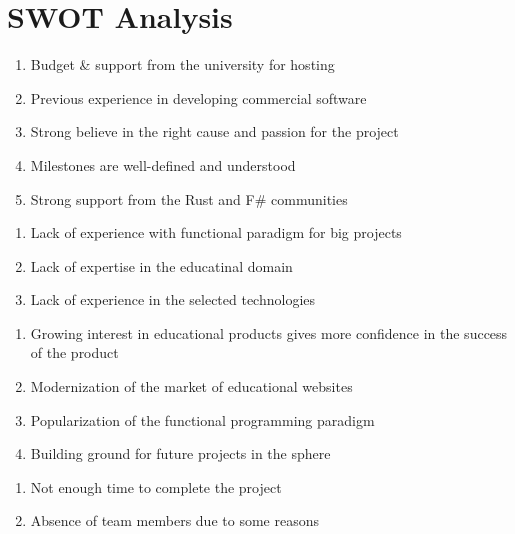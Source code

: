 \documentclass[a4paper,11pt,twoside]{report}
\theoremstyle{definition}
\begin{document}
\chapter*{SWOT Analysis}
\begin{tcbraster}[raster columns=2, boxrule=0mm, arc=0mm]
  \singlespacing
\begin{tcolorbox}[equal height group=A, size=fbox, colback=swotS!60, colframe=swotS!80!black, title=\textsc{strengths}]
\begin{enumerate} \itemsep0em 
\item Budget \& support from the university for hosting
\item Previous experience in developing commercial software
\item Strong believe in the right cause and passion for the project
\item Milestones are well-defined and understood
\item Strong support from the Rust and F\# communities
\end{enumerate}
\end{tcolorbox}
\begin{tcolorbox}[equal height group=A, size=fbox, colback=swotW!60, colframe=swotW!80!black, title=\textsc{weaknesses}]
\begin{enumerate} \itemsep0em 
\item Lack of experience with functional paradigm for big projects
\item Lack of expertise in the educatinal domain
\item Lack of experience in the selected technologies
\end{enumerate}
\end{tcolorbox}
\begin{tcolorbox}[equal height group=B, size=fbox, colback=swotO!60, colframe=swotO!80!black, title=\textsc{opportunities}]
\begin{enumerate} \itemsep0em 
\item Growing interest in educational products gives more confidence in the success of the product
\item Modernization of the market of educational websites  
\item Popularization of the functional programming paradigm
\item Building ground for future projects in the sphere 
\end{enumerate}
\end{tcolorbox}
\begin{tcolorbox}[equal height group=B, size=fbox, colback=swotT!60, colframe=swotT!80!black, title=\textsc{threats}]
\begin{enumerate} \itemsep0em 
\item Not enough time to complete the project
\item Absence of team members due to some reasons
\end{enumerate}
\end{tcolorbox}
\end{tcbraster}
\end{document}
